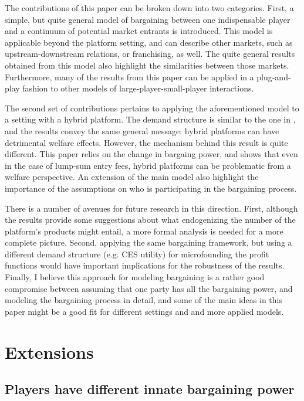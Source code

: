 \documentclass[a4paper]{article}
\begin{document}
The contributions of this paper can be broken down into two categories.
First, a simple, but quite general model of bargaining between one indispensable player and a continuum of potential market entrants is introduced.
This model is applicable beyond the platform setting, and can describe other markets, such as upstream-downstream relations, or franchising, as well.
The quite general results obtained from this model also highlight the similarities between those markets.
Furthermore, many of the results from this paper can be applied in a plug-and-play fashion to other models of large-player-small-player interactions.

The second set of contributions pertains to applying the aforementioned model to a setting with a hybrid platform.
The demand structure is similar to the one in \textcite{anderson2021hybrid}, and the results convey the same general message: hybrid platforms can have detrimental welfare effects.
However, the mechanism behind this result is quite different.
This paper relies on the change in bargaing power, and shows that even in the case of lump-sum entry fees, hybrid platforms can be problematic from a welfare perspective.
An extension of the main model also highlight the importance of the assumptions on who is participating in the bargaining process.

There is a number of avenues for future research in this direction.
First, although the results provide some suggestions about what endogenizing the number of the platform's products might entail, a more formal analysis is needed for a more complete picture.
Second, applying the same bargaining framework, but using a different demand structure (e.g. CES utility) for microfounding the profit functions would have important implications for the robustness of the results.
Finally, I believe this approach for modeling bargaining is a rather good compromise between assuming that one party has all the bargaining power, and modeling the bargaining process in detail, and some of the main ideas in this paper might be a good fit for different settings and and more applied models.


\appendix

\printbibliography


\section{Extensions}
\label{sec:extensions}

\subsection{Players have different innate bargaining power}
\label{sec:higher_bargaining_power}
\end{document}
